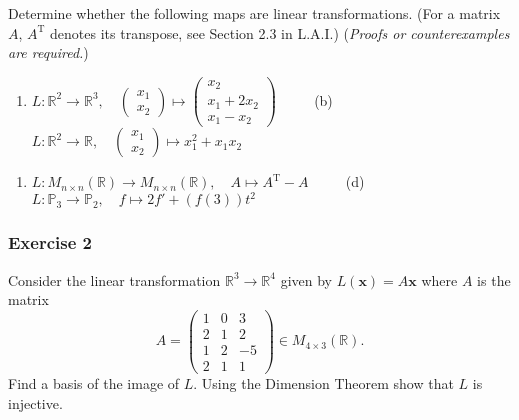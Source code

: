 \documentclass[
  12pt,
  a4paper,
  twoside]{article}
\providecommand{\tightlist}{%
  \setlength{\itemsep}{0pt}\setlength{\parskip}{0pt}}
\theoremstyle{plain}
\theoremstyle{definition}
\begin{document}
Determine whether the following maps are linear transformations. (For a matrix
\(A\), \(A^\mathrm{T}\) denotes its transpose, see Section 2.3 in L.A.I.) (\emph{Proofs or
counterexamples are required.})

\begin{enumerate}
\def\labelenumi{(\alph{enumi})}
\tightlist
\item
  \(L: \mathbb{R}^2 \rightarrow \mathbb{R}^3, \quad \left(\begin{array}{c} x_1 \\ x_2 \end{array}\right) \mapsto \left(\begin{array}{c}x_2\\ x_1 + 2x_2 \\ x_1-x_2\end{array}\right)\) \(\qquad\) (b) \(L: \mathbb{R}^2 \rightarrow \mathbb{R}, \quad \left(\begin{array}{c}x_1 \\ x_2 \end{array}\right) \mapsto x_1^2 + x_1x_2\)
\end{enumerate}

\begin{enumerate}
\def\labelenumi{(\alph{enumi})}
\setcounter{enumi}{2}
\tightlist
\item
  \(L: M_{n \times n}(\mathbb{R}) \rightarrow M_{n \times n}(\mathbb{R}), \quad A \mapsto A^\mathrm{T} - A\) \(\qquad\) (d) \(L: \mathbb{P}_3 \rightarrow \mathbb{P}_2, \quad f \mapsto 2f' + (f(3))t^2\)
\end{enumerate}

\hypertarget{exercise-2-6}{%
\subsubsection*{Exercise 2}\label{exercise-2-6}}

Consider the linear transformation \(\mathbb{R}^3 \rightarrow \mathbb{R}^4\)
given by \(L(\mathbf{x}) = A\mathbf{x}\) where \(A\) is the matrix
\[A=\left(\begin{array}{ccc} 1 & 0 & 3\\ 2 & 1 & 2 \\ 1& 2 & -5\\ 2 & 1 & 1 \end{array}\right) \in M_{4 \times 3}(\mathbb{R}).\]
Find a basis of the image of \(L\). Using the Dimension Theorem show that \(L\) is injective.
\end{document}
